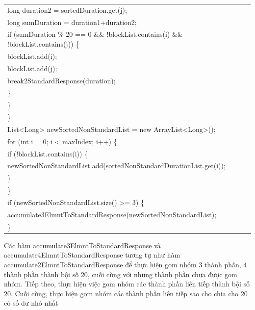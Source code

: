 \documentclass[a4paper, 13pt]{report}
\begin{document}
\begin{enumerate}[label=\textbf{PL\arabic*}]
\begin{flushleft}
\begin{tabular}{ |l| }
\hspace{1.5cm} long duration2 = sortedDuration.get(j);\\
\hspace{1.5cm} long sumDuration = duration1+duration2;\\
\hspace{1.5cm} if (sumDuration \% 20 == 0 \&\& !blockList.contains(i) \&\& !blockList.contains(j)) \{\\
\hspace{2cm} blockList.add(i);\\
\hspace{2cm} blockList.add(j);\\
\hspace{2cm} break2StandardResponse(duration);\\
\hspace{1.5cm} \}\\
\hspace{1cm} \}\\
\hspace{0.5cm} \}\\
\hspace{0.5cm} List<Long> newSortedNonStandardList = new ArrayList<Long>();\\
\hspace{0.5cm} for (int i = 0; i < maxIndex; i++) \{\\
\hspace{1.5cm}     if (!blockList.contains(i)) \{\\
\hspace{2cm}        newSortedNonStandardList.add(sortedNonStandardDurationList.get(i));\\
\hspace{1.5cm}     \}\\
\hspace{0.5cm} \}\\
\hspace{0.5cm} if (newSortedNonStandardList.size() >= 3) \{\\
\hspace{1.5cm}      accumulate3ElmntToStandardResponse(newSortedNonStandardList);\\
\hspace{0.5cm} \}\\
\hline
\end{tabular}
\end{flushleft}
Các hàm accumulate3ElmntToStandardResponse và accumulate4ElmntToStandardResponse tương tự như hàm accumulate2ElmntToStandardResponse để thực hiện gom nhóm 3 thành phần, 4 thành phần thành bội số 20, cuối cùng với những thành phần chưa được gom nhóm. Tiếp theo, thực hiện việc gom nhóm các thành phần liên tiếp thành bội số 20. Cuối cùng, thực hiện gom nhóm các thành phần liên tiếp sao cho chia cho 20 có số dư nhỏ nhất\\

\end{enumerate}
\end{document}
